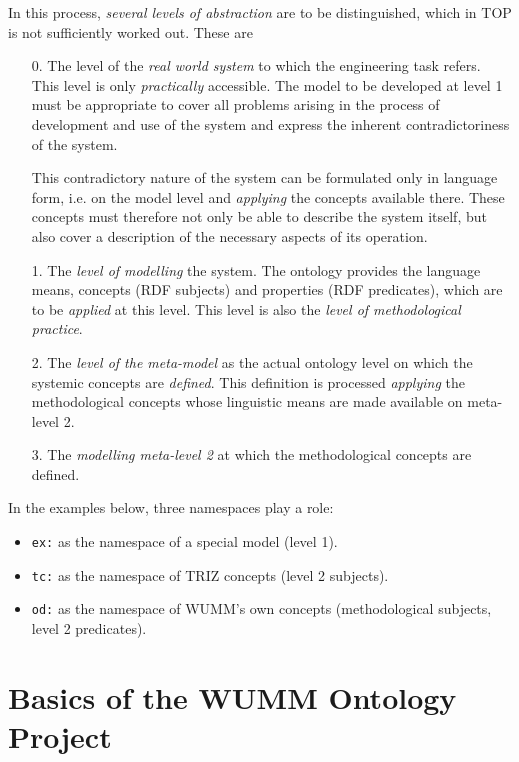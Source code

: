 \documentclass[11pt,a4paper]{article}
\begin{document}
In this process, \emph{several levels of abstraction} are to be distinguished,
which in TOP is not sufficiently worked out. These are
\begin{itemize}[noitemsep]
\item [0.] The level of the \emph{real world system} to which the engineering
  task refers. This level is only \emph{practically} accessible. The model to
  be developed at level 1 must be appropriate to cover all problems arising in
  the process of development and use of the system and express the inherent
  contradictoriness of the system.

  This contradictory nature of the system can be formulated only in language
  form, i.e. on the model level and \emph{applying} the concepts available
  there.  These concepts must therefore not only be able to describe the
  system itself, but also cover a description of the necessary aspects of its
  operation.
\item[1.] The \emph{level of modelling} the system. The ontology provides the
  language means, concepts (RDF subjects) and properties (RDF predicates),
  which are to be \emph{applied} at this level. This level is also the
  \emph{level of methodological practice}.
\item[2.] The \emph{level of the meta-model} as the actual ontology level on
  which the systemic concepts are \emph{defined}. This definition is processed
  \emph{applying} the methodological concepts whose linguistic means are made
  available on meta-level 2.
\item [3.] The \emph{modelling meta-level 2} at which the methodological
  concepts are defined.
\end{itemize}

In the examples below, three namespaces play a role:
\begin{itemize}[noitemsep]
\item \texttt{ex:} as the namespace of a special model (level 1). 
\item \texttt{tc:} as the namespace of TRIZ concepts (level 2 subjects).
\item \texttt{od:} as the namespace of WUMM's own concepts
  (methodological subjects, level 2 predicates). 
\end{itemize}

\section{Basics of the WUMM Ontology Project}
\end{document}
